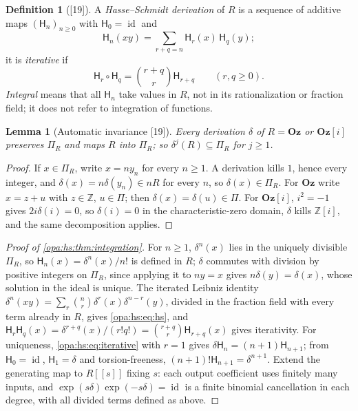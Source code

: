 \documentclass[11pt,oneside]{article}
\numberwithin{equation}{section}
\newtheorem{lemma}[lemma]{Lemma}
\theoremstyle{definition}
\newtheorem{definition}[definition]{Definition}
\theoremstyle{remark}
\newcommand{\Oz}{\mathbf{Oz}}
\newcommand{\Og}{\mathbf{Oz}[i]}
\newcommand{\Z}{\mathbb Z}
\newcommand{\id}{\operatorname{id}}
\newcommand{\src}[1]{\textup{\textsf{\small[#1]}}}
\begin{document}
\begin{definition}[\src{19}]\label{opa:hs:def:hs}
A \emph{Hasse--Schmidt derivation} of $R$ is a sequence of additive maps $(\mathsf H_n)_{n\ge0}$ with $\mathsf H_0=\id$ and
\begin{equation}\label{opa:hs:eq:hs}
 \mathsf H_n(xy)=\sum_{r+q=n}\mathsf H_r(x)\,\mathsf H_q(y);
\end{equation}
it is \emph{iterative} if
\begin{equation}\label{opa:hs:eq:iterative}
 \mathsf H_r\circ\mathsf H_q=\binom{r+q}r\mathsf H_{r+q}\qquad(r,q\ge0).
\end{equation}
\emph{Integral} means that all $\mathsf H_n$ take values in $R$, not in its rationalization or fraction field; it does not refer to integration
of functions.
\end{definition}

\begin{lemma}[Automatic invariance \src{19}]\label{opa:hs:lem:autoinvariance}
Every derivation $\delta$ of $R=\Oz$ or $\Og$ preserves $\Pi_R$ and maps $R$ into $\Pi_R$; so $\delta^j(R)\subseteq\Pi_R$ for $j\ge1$.
\end{lemma}
\begin{proof}
If $x\in\Pi_R$, write $x=ny_n$ for every $n\ge1$. A derivation kills $1$, hence every integer, and $\delta(x)=n\delta(y_n)\in nR$ for every $n$,
so $\delta(x)\in\Pi_R$. For $\Oz$ write $x=z+u$ with $z\in\Z$, $u\in\Pi$; then $\delta(x)=\delta(u)\in\Pi$. For $\Og$, $i^2=-1$ gives
$2i\delta(i)=0$, so $\delta(i)=0$ in the characteristic-zero domain, $\delta$ kills $\Z[i]$, and the same decomposition applies.
\end{proof}

\begin{proof}[Proof of \cref{opa:hs:thm:integration}]
For $n\ge1$, $\delta^n(x)$ lies in the uniquely divisible $\Pi_R$, so $\mathsf H_n(x)=\delta^n(x)/n!$ is defined in $R$; $\delta$ commutes with
division by positive integers on $\Pi_R$, since applying it to $ny=x$ gives $n\delta(y)=\delta(x)$, whose solution in the ideal is unique. The
iterated Leibniz identity $\delta^n(xy)=\sum_r\binom nr\delta^r(x)\delta^{n-r}(y)$, divided in the fraction field with every term already in $R$,
gives \eqref{opa:hs:eq:hs}, and $\mathsf H_r\mathsf H_q(x)=\delta^{r+q}(x)/(r!q!)=\binom{r+q}r\mathsf H_{r+q}(x)$ gives iterativity. For uniqueness,
\eqref{opa:hs:eq:iterative} with $r=1$ gives $\delta\mathsf H_n=(n+1)\mathsf H_{n+1}$; from $\mathsf H_0=\id$, $\mathsf H_1=\delta$ and torsion-freeness,
$(n+1)!\mathsf H_{n+1}=\delta^{n+1}$. Extend the generating map to $R[[s]]$ fixing $s$: each output coefficient uses finitely many inputs, and
$\exp(s\delta)\exp(-s\delta)=\id$ is a finite binomial cancellation in each degree, with all divided terms defined as above.
\end{proof}
\end{document}
